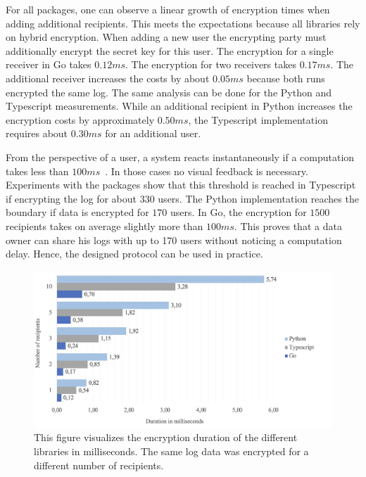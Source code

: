 \documentclass[../main.tex]{subfiles}
\begin{document}
For all packages, one can observe a linear growth of encryption times when adding additional recipients.
This meets the expectations because all libraries rely on hybrid encryption.
When adding a new user the encrypting party must additionally encrypt the secret key for this user.
The encryption for a single receiver in Go takes $0.12ms$.
The encryption for two receivers takes $0.17ms$.
The additional receiver increases the costs by about $0.05ms$ because both runs encrypted the same log.
The same analysis can be done for the Python and Typescript measurements.
While an additional recipient in Python increases the encryption costs by approximately $0.50ms$, the Typescript implementation requires about $0.30ms$ for an additional user.

From the perspective of a user, a system reacts instantaneously if a computation takes less than $100ms$~\cite{Nielson1993}.
In those cases no visual feedback is necessary.
Experiments with the packages show that this threshold is reached in Typescript if encrypting the log for about $330$ users.
The Python implementation reaches the boundary if data is encrypted for $170$ users.
In Go, the encryption for $1500$ recipients takes on average slightly more than $100ms$.
This proves that a data owner can share his logs with up to 170 users without noticing a computation delay.
Hence, the designed protocol can be used in practice.




\begin{figure}[ht]
    \includegraphics[scale=0.3]{../img/07/performance_tests.jpg}
    \centering
    \caption[Encryption duration]{This figure visualizes the encryption duration of the different libraries in milliseconds. The same log data was encrypted for a different number of recipients.}
    \label{fig:performance}
\end{figure}
\end{document}

